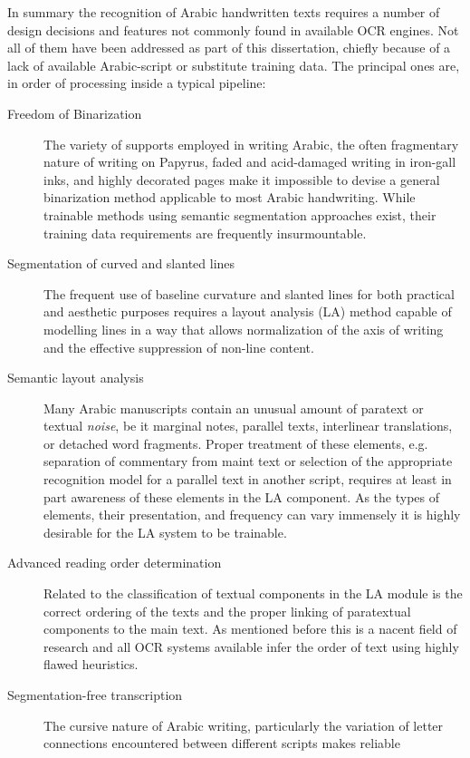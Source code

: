 In summary the recognition of Arabic handwritten texts requires a number of
design decisions and features not commonly found in available OCR engines. Not
all of them have been addressed as part of this dissertation, chiefly because
of a lack of available Arabic-script or substitute training data. The principal
ones are, in order of processing inside a typical pipeline:

\begin{description}
	\item[Freedom of Binarization] The variety of supports employed in
		writing Arabic, the often fragmentary nature of writing on
		Papyrus, faded and acid-damaged writing in iron-gall inks, and
		highly decorated pages make it impossible to devise a general
		binarization method applicable to most Arabic handwriting.
		While trainable methods using semantic segmentation approaches
		exist, their training data requirements are frequently
		insurmountable.
	\item[Segmentation of curved and slanted lines] The frequent use of
		baseline curvature and slanted lines for both practical and
		aesthetic purposes requires a layout analysis (LA) method
		capable of modelling lines in a way that allows normalization
		of the axis of writing and the effective suppression of
		non-line content.
	\item[Semantic layout analysis] Many Arabic manuscripts contain an
		unusual amount of paratext or textual \emph{noise}, be it
		marginal notes, parallel texts, interlinear translations, or
		detached word fragments. Proper treatment of these elements,
		e.g. separation of commentary from maint text or selection of
		the appropriate recognition model for a parallel text in
		another script, requires at least in part awareness of these
		elements in the LA component. As the types of elements, their
		presentation, and frequency can vary immensely it is highly
		desirable for the LA system to be trainable.
	\item[Advanced reading order determination] Related to the
		classification of textual components in the LA module is the
		correct ordering of the texts and the proper linking of
		paratextual components to the main text. As mentioned before
		this is a nacent field of research and all OCR systems
		available infer the order of text using highly flawed
		heuristics.
	\item[Segmentation-free transcription] The cursive nature of Arabic
		writing, particularly the variation of letter connections
		encountered between different scripts makes reliable

\end{description}
